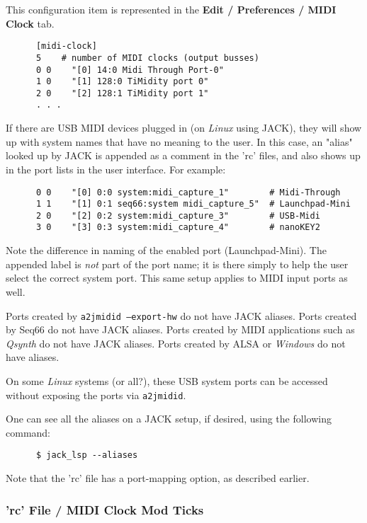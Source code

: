    This configuration item is represented in the
   \textbf{Edit / Preferences / MIDI Clock} tab.

   \begin{verbatim}
      [midi-clock]
      5    # number of MIDI clocks (output busses)
      0 0    "[0] 14:0 Midi Through Port-0"
      1 0    "[1] 128:0 TiMidity port 0"
      2 0    "[2] 128:1 TiMidity port 1"
      . . .
   \end{verbatim}

   If there are USB MIDI devices plugged in (on \textsl{Linux} using JACK),
   they will show up with system names that have no meaning to the user.
   In this case, an "alias" looked up by JACK is appended as a comment in the
   'rc' files, and also shows up in the port lists in the user interface.
   For example:

   \begin{verbatim}
      0 0    "[0] 0:0 system:midi_capture_1"        # Midi-Through
      1 1    "[1] 0:1 seq66:system midi_capture_5"  # Launchpad-Mini
      2 0    "[2] 0:2 system:midi_capture_3"        # USB-Midi
      3 0    "[3] 0:3 system:midi_capture_4"        # nanoKEY2
   \end{verbatim}

   Note the difference in naming of the enabled port (Launchpad-Mini).
   The appended label is \textsl{not} part of the port name;
   it is there simply to help the user select the correct system port.
   This same setup applies to MIDI input ports as well.

   Ports created by \texttt{a2jmidid --export-hw} do not have JACK aliases.
   Ports created by Seq66 do not have JACK aliases.  Ports created by MIDI
   applications such as \textsl{Qsynth} do not have JACK aliases. Ports
   created by ALSA or \textsl{Windows} do not have aliases.

   On some \textsl{Linux} systems (or all?),
   these USB system ports can be accessed without
   exposing the ports via \texttt{a2jmidid}.

   One can see all the aliases on a JACK setup, if desired, using the following
   command:

   \begin{verbatim}
      $ jack_lsp --aliases
   \end{verbatim}

   Note that the 'rc' file has a port-mapping option, as described earlier.

\subsubsection{'rc' File / MIDI Clock Mod Ticks}
\label{subsubsec:configuration_rc_midi_cmt}

